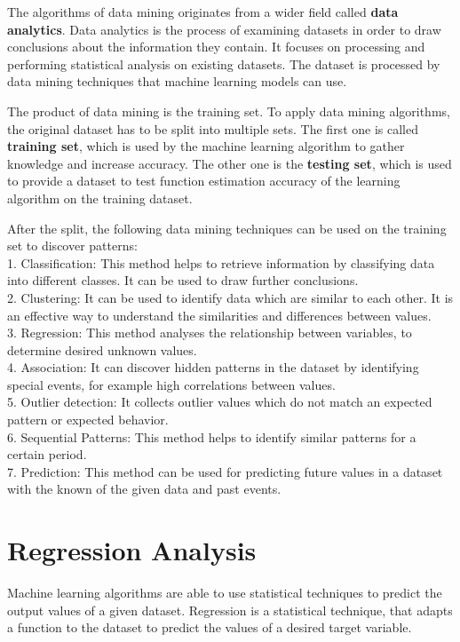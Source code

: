 The algorithms of data mining originates from a wider field called \textbf{data analytics}. Data analytics is the process of examining datasets in order to draw conclusions about the information they contain. It focuses on processing and performing statistical analysis on existing datasets. The dataset is processed by data mining techniques that machine learning models can use. \medskip

The product of data mining is the training set. To apply data mining algorithms, the original dataset has to be split into multiple sets. The first one is called \textbf{training set}, which is used by the machine learning algorithm to gather knowledge and increase accuracy. The other one is the \textbf{testing set}, which is used to provide a dataset to test function estimation accuracy of the learning algorithm on the training dataset.\medskip

After the split, the following data mining techniques \cite{pujari2001data} can be used on the training set to discover patterns:\\
1. Classification: This method helps to retrieve information by classifying data into different classes. It can be used to draw further conclusions.\\
2. Clustering: It can be used to identify data which are similar to each other. It is an effective way to understand the similarities and differences between values.\\
3. Regression:  This method analyses the relationship between variables, to determine desired unknown values.\\
4. Association: It can discover hidden patterns in the dataset by identifying special events, for example high correlations between values.\\
5. Outlier detection: It collects outlier values which do not match an expected pattern or expected behavior. \\
6. Sequential Patterns: This method helps to identify similar patterns for a certain period. \\
7. Prediction: This method can be used for predicting future values in a dataset with the known of the given data and past events.  



\section{Regression Analysis}

Machine learning algorithms are able to use statistical techniques to predict the output values of a given dataset. Regression \cite{graybill1994regression} is a statistical technique, that adapts a function to the dataset to predict the values of a desired target variable. 

